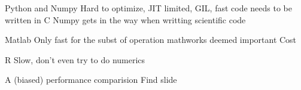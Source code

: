 \documentclass{beamer}
\begin{document}
\begin{frame}{Python and Numpy}
  Hard to optimize, JIT limited, GIL, fast code needs to be written in C
  Numpy gets in the way when writting scientific code
\end{frame}

\begin{frame}{Matlab}
  Only fast for the subst of operation mathworks deemed important
  Cost
\end{frame}

\begin{frame}{R}
  Slow, don't even try to do numerics
\end{frame}

\begin{frame}{A (biased) performance comparision}
  Find slide
\end{frame}
\end{document}
